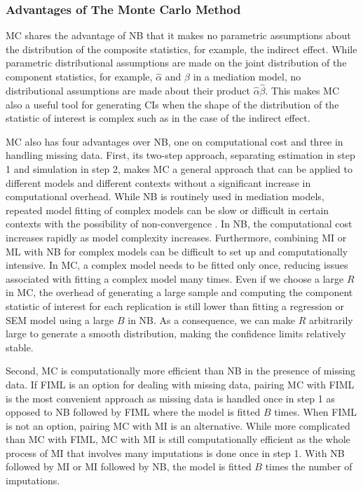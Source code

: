 \documentclass[man]{apa7}\usepackage[]{graphicx}\usepackage[]{xcolor}
\begin{document}
\subsubsection{Advantages of The Monte Carlo Method}

MC shares the advantage of NB
that it makes no parametric assumptions about the distribution
of the composite statistics,
for example,
the indirect effect.
While parametric distributional assumptions are made
on the joint distribution of the component statistics,
for example,
$\hat{\alpha}$ and $\hat{\beta}$ in a mediation model,
no distributional assumptions are made about their product
$\hat{\alpha}\hat{\beta}$.
This makes MC also a useful tool for generating CIs
when the shape of the distribution of the statistic of interest
is complex such as in the case of the indirect effect.

MC also has four advantages over NB,
one on computational cost and three in handling missing data.
First,
its two-step approach,
separating estimation in step 1 and simulation in step 2,
makes MC a general approach that can be applied to different models and different contexts without a significant increase in computational overhead.
While NB is routinely used in mediation models,
repeated model fitting of complex models can be slow or difficult in certain contexts with the possibility of non-convergence
\parencite[e.g.,][]{Lib-Multilevel-Modeling-Mediation-Bauer-2006}.
In NB, the computational cost increases rapidly as model complexity increases.
Furthermore,
combining MI or ML with NB for complex models can be difficult to set up and computationally intensive.
In MC,
a complex model needs to be fitted only once,
reducing issues associated with fitting a complex model many times.
Even if we choose a large $R$ in MC,
the overhead of generating a large sample and computing the component statistic of interest for each replication is still lower than fitting a regression or SEM model using a large $B$ in NB.
As a consequence,
we can make $R$ arbitrarily large to generate a smooth distribution, making the confidence limits relatively stable.

Second,
MC is computationally more efficient than NB in the presence of missing data.
If FIML is an option for dealing with missing data,
pairing MC with FIML is the most convenient approach as missing data is handled once in step 1 as opposed to NB followed by FIML where the model is fitted $B$ times.
When FIML is not an option, pairing MC with MI is an alternative.
While more complicated than MC with FIML,
MC with MI is still computationally efficient as the whole process of MI that involves many imputations is done once in step 1.
With NB followed by MI or MI followed by NB, the model is fitted $B$ times the number of imputations.
\end{document}
